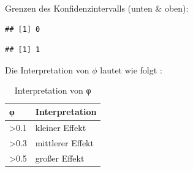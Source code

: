 \documentclass[
]{book}
\newenvironment{Shaded}{\begin{snugshade}}{\end{snugshade}}
\newcommand{\FunctionTok}[1]{\textcolor[rgb]{0.13,0.29,0.53}{\textbf{#1}}}
\newcommand{\NormalTok}[1]{#1}
\newcommand{\SpecialCharTok}[1]{\textcolor[rgb]{0.81,0.36,0.00}{\textbf{#1}}}
\begin{document}
Grenzen des Konfidenzintervalls (unten \& oben):

\begin{Shaded}
\end{Shaded}

\begin{verbatim}
## [1] 0
\end{verbatim}

\begin{Shaded}
\end{Shaded}

\begin{verbatim}
## [1] 1
\end{verbatim}

Die Interpretation von \(\phi\) lautet wie folgt \citet{cohen1988statistical}:

\begin{table}[tbp]

\begin{center}
\begin{threeparttable}

\caption{\label{tab:unnamed-chunk-292}Interpretation von φ}

\begin{tabular}{ll}
\toprule
φ & \multicolumn{1}{c}{Interpretation}\\
\midrule
>0.1 & kleiner Effekt\\
>0.3 & mittlerer Effekt\\
>0.5 & großer Effekt\\
\bottomrule
\end{tabular}

\end{threeparttable}
\end{center}

\end{table}
\end{document}
